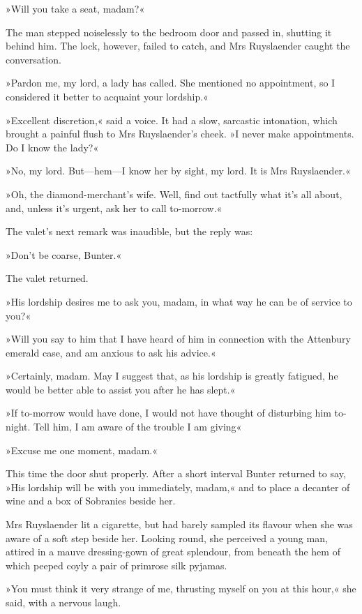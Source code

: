 »Will you take a seat, madam?«

The man stepped noiselessly to the bedroom door and passed in, shutting it behind him. The lock, however, failed to catch, and Mrs Ruyslaender caught the conversation.

»Pardon me, my lord, a lady has called. She mentioned no appointment, so I considered it better to acquaint your lordship.«

»Excellent discretion,« said a voice. It had a slow, sarcastic intonation, which brought a painful flush to Mrs Ruyslaender's cheek. »I never make appointments. Do I know the lady?«

»No, my lord. But—hem—I know her by sight, my lord. It is Mrs Ruyslaender.«

»Oh, the diamond-merchant's wife. Well, find out tactfully what it's all about, and, unless it's urgent, ask her to call to-morrow.«

The valet's next remark was inaudible, but the reply was:

»Don't be coarse, Bunter.«

The valet returned.

»His lordship desires me to ask you, madam, in what way he can be of service to you?«

»Will you say to him that I have heard of him in connection with the Attenbury emerald case, and am anxious to ask his advice.«

»Certainly, madam. May I suggest that, as his lordship is greatly fatigued, he would be better able to assist you after he has slept.«

»If to-morrow would have done, I would not have thought of disturbing him to-night. Tell him, I am aware of the trouble I am giving\longdash«

»Excuse me one moment, madam.«

This time the door shut properly. After a short interval Bunter returned to say, »His lordship will be with you immediately, madam,« and to place a decanter of wine and a box of Sobranies beside her.

Mrs Ruyslaender lit a cigarette, but had barely sampled its flavour when she was aware of a soft step beside her. Looking round, she perceived a young man, attired in a mauve dressing-gown of great splendour, from beneath the hem of which peeped coyly a pair of primrose silk pyjamas.

»You must think it very strange of me, thrusting myself on you at this hour,« she said, with a nervous laugh.

